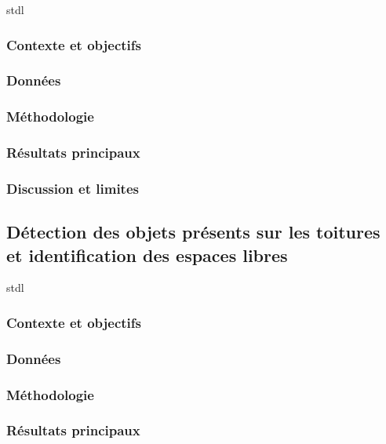 {{{{%
\par{\acrshort{stdl}}

\subsubsection{Contexte et objectifs}

\subsubsection{Données}

\subsubsection{Méthodologie}

\subsubsection{Résultats principaux}

\subsubsection{Discussion et limites}

\subsection{Détection des objets présents sur les toitures et identification des espaces libres}

\par{\acrshort{stdl}}

\subsubsection{Contexte et objectifs}

\subsubsection{Données}

\subsubsection{Méthodologie}

\subsubsection{Résultats principaux}

}}}}
